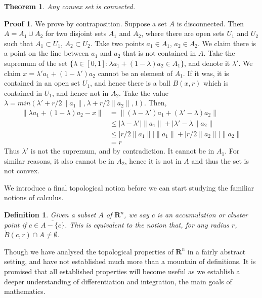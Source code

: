 \documentclass[12pt]{amsbook}
\theoremstyle{plain}
\newtheorem{definition}{Definition}
\newtheorem{theorem}{Theorem}
\theoremstyle{definition}
\newtheorem*{prf}{Proof}
\begin{document}
\begin{theorem}
  Any convex set is connected.
\end{theorem}
\begin{prf}
  We prove by contraposition. Suppose a set $A$ is disconnected. Then $A = A_1 \cup A_2$ for two disjoint sets $A_1$ and $A_2$, where there are open sets $U_1$ and $U_2$ such that $A_1 \subset U_1$, $A_2 \subset U_2$. Take two points $a_1 \in A_1$, $a_2 \in A_2$. We claim there is a point on the line between $a_1$ and $a_2$ that is not contained in $A$. Take the supremum of the set $\{ \lambda \in [0,1] : \lambda a_1 + (1 - \lambda) a_2 \in A_1 \}$, and denote it $\lambda'$. We claim $x = \lambda' a_1 + (1 - \lambda') a_2$ cannot be an element of $A_1$. If it was, it is contained in an open set $U_1$, and hence there is a ball $B(x,r)$ which is contained in $U_1$, and hence not in $A_2$. Take the value $\lambda = min(\lambda' + r/2\|a_1\|, \lambda + r/2\|a_2\|, 1)$. Then,
  \begin{align*}
  \| \lambda a_1 + (1 - \lambda) a_2 - x \| &= \| (\lambda - \lambda') a_1 + (\lambda' - \lambda) a_2 \|\\
      &\leq |\lambda - \lambda'| \| a_1 \| + |\lambda' - \lambda \|a_2\|\\
      &\leq |r/2\|a_1\|| \|a_1\| + |r/2\|a_2\|| \|a_2\|\\
      &= r
  \end{align*}
  Thus $\lambda'$ is not the supremum, and by contradiction. It cannot be in $A_1$. For similar reasons, it also cannot be in $A_2$, hence it is not in $A$ and thus the set is not convex.
\end{prf}

We introduce a final topological notion before we can start studying the familiar notions of calculus.

\begin{definition}
  Given a subset $A$ of $\mathbf{R}^n$, we say $c$ is an accumulation or cluster point if $c \in \overline{A - \{c\}}$. This is equivalent to the notion that, for any radius $r$, $\mathring{B}(c,r) \cap A \neq \emptyset$.
\end{definition}

Though we have analysed the topological properties of $\mathbf{R}^n$ in a fairly abstract setting, and have not established much more than a mountain of definitions. It is promised that all established properties will become useful as we establish a deeper understanding of differentiation and integration, the main goals of mathematics.
\end{document}

